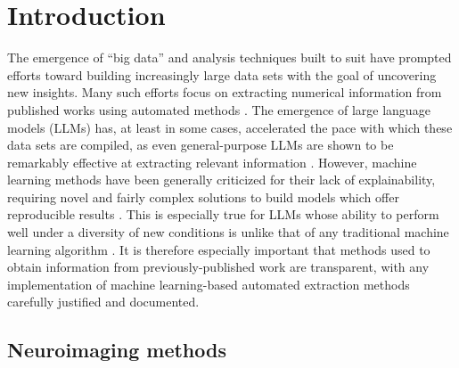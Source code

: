 


\section{Introduction}
\label{sec:papertag.introduction}

The emergence of ``big data'' and analysis techniques built to suit have prompted efforts toward building increasingly large data sets with the goal of uncovering new insights. Many such efforts focus on extracting numerical information from published works using automated methods \cite{OlivettiEtAl2020}. The emergence of large language models (LLMs) has, at least in some cases, accelerated the pace with which these data sets are compiled, as even general-purpose LLMs are shown to be remarkably effective at extracting relevant information \cite{PolakEtAl2023, DunnEtAl2022}. However, machine learning methods have been generally criticized for their lack of explainability, requiring novel and fairly complex solutions to build models which offer reproducible results \cite{DuEtAl2019, Doshi-VelezKim2017}. This is especially true for LLMs whose ability to perform well under a diversity of new conditions is unlike that of any traditional machine learning algorithm \cite{ZhaoEtAl2024}. It is therefore especially important that methods used to obtain information from previously-published work are transparent, with any implementation of machine learning-based automated extraction methods carefully justified and documented.

\subsection{Neuroimaging methods}

